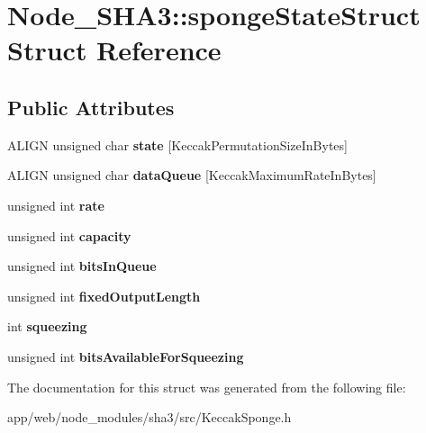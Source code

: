 \hypertarget{struct_node___s_h_a3_1_1sponge_state_struct}{}\section{Node\+\_\+\+S\+H\+A3\+:\+:sponge\+State\+Struct Struct Reference}
\label{struct_node___s_h_a3_1_1sponge_state_struct}
\subsection*{Public Attributes}
\begin{DoxyCompactItemize}
\item 
\mbox{\label{struct_node___s_h_a3_1_1sponge_state_struct_a51eb2322a14a570e6a4a458ca34eaf90}} 
A\+L\+I\+GN unsigned char {\bfseries state} \mbox{[}Keccak\+Permutation\+Size\+In\+Bytes\mbox{]}
\item 
\mbox{\label{struct_node___s_h_a3_1_1sponge_state_struct_a6e5d4bc5bd6ac7cfef66f0878cf1a051}} 
A\+L\+I\+GN unsigned char {\bfseries data\+Queue} \mbox{[}Keccak\+Maximum\+Rate\+In\+Bytes\mbox{]}
\item 
\mbox{\label{struct_node___s_h_a3_1_1sponge_state_struct_afd4be2b755ec6657bbd8f60e7e85b9bb}} 
unsigned int {\bfseries rate}
\item 
\mbox{\label{struct_node___s_h_a3_1_1sponge_state_struct_ae84cb750e1ad6f001323e4129fb5f2c3}} 
unsigned int {\bfseries capacity}
\item 
\mbox{\label{struct_node___s_h_a3_1_1sponge_state_struct_a2698e49b4944e0a9e6def8563da1613d}} 
unsigned int {\bfseries bits\+In\+Queue}
\item 
\mbox{\label{struct_node___s_h_a3_1_1sponge_state_struct_a9933dac85dc2c07003cb407e84124efb}} 
unsigned int {\bfseries fixed\+Output\+Length}
\item 
\mbox{\label{struct_node___s_h_a3_1_1sponge_state_struct_aa6dd7f27eabdf885f1b86639513c7524}} 
int {\bfseries squeezing}
\item 
\mbox{\label{struct_node___s_h_a3_1_1sponge_state_struct_a8de57a2c107dcbf2a1b1cf18c08c9234}} 
unsigned int {\bfseries bits\+Available\+For\+Squeezing}
\end{DoxyCompactItemize}


The documentation for this struct was generated from the following file\+:\begin{DoxyCompactItemize}
\item 
app/web/node\+\_\+modules/sha3/src/Keccak\+Sponge.\+h\end{DoxyCompactItemize}
